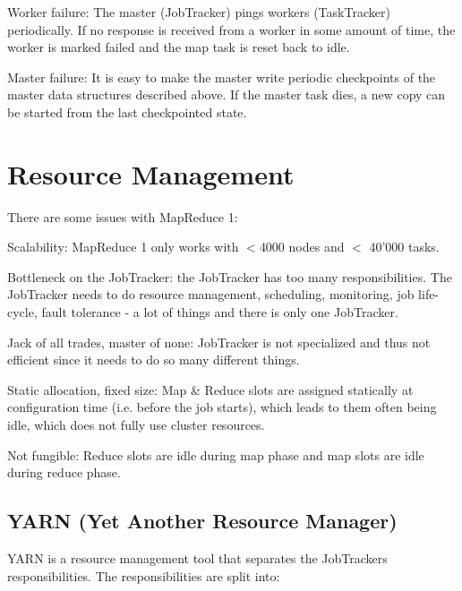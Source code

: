 \documentclass[11pt,oneside,a4paper]{article}
\begin{document}
\begin{compactitem}
\item Worker failure: The master (JobTracker) pings workers (TaskTracker) periodically. If no response is received from a worker in some amount of time, the worker is marked failed and the map task is reset back to idle.
\item Master failure: It is easy to make the master write periodic checkpoints of the master data structures described above. If the master task dies, a new copy can be started from the last checkpointed state.
\end{compactitem}

\newpage

\section{Resource Management}

There are some issues with MapReduce 1:

\begin{compactitem}
\item Scalability: MapReduce 1 only works with $<$4000 nodes and $<$ 40'000 tasks.
\item Bottleneck on the JobTracker: the JobTracker has too many responsibilities. The JobTracker needs to do resource management, scheduling, monitoring, job life-cycle, fault tolerance - a lot of things and there is only one JobTracker.
\item Jack of all trades, master of none: JobTracker is not specialized and thus not efficient since it needs to do so many different things.
\item Static allocation, fixed size: Map \& Reduce slots are assigned statically at configuration time (i.e. before the job starts), which leads to them often being idle, which does not fully use cluster resources.
\item Not fungible: Reduce slots are idle during map phase and map slots are idle during reduce phase.\\
\end{compactitem}

\subsection{YARN (Yet Another Resource Manager)}

YARN is a resource management tool that separates the JobTrackers responsibilities. The responsibilities are split into:
\end{document}
